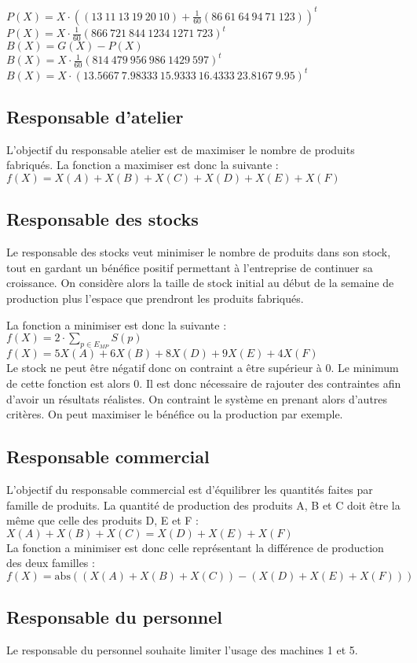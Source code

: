 \documentclass[a4paper, 11pt]{article}
\begin{document}
$P(X) = X\cdot\left((13~11~13~19~20~10) + \frac{1}{60}(86~61~64~94~71~123)\right)^t$ \\
$P(X) = X\cdot\frac{1}{60}(866~721~844~1234~1271~723)^t$ \\

$B(X) = G(X) - P(X)$ \\
$B(X) = X\cdot\frac{1}{60}(814~479~956~986~1429~597)^t$ \\
$B(X) = X\cdot(13.5667~7.98333~15.9333~16.4333~23.8167~9.95)^t$ \\

\subsection{Responsable d'atelier}
L'objectif du responsable atelier est de maximiser le nombre de produits fabriqués.
La fonction a maximiser est donc la suivante : \\
$ f(X) = X(A) + X(B) + X(C) + X(D) + X(E) + X(F) $

\subsection{Responsable des stocks}
Le responsable des stocks veut minimiser le nombre de produits dans son stock,
tout en gardant un bénéfice positif permettant à l'entreprise de continuer sa croissance.
On considère alors la taille de stock initial au début de la semaine de production
plus l'espace que prendront les produits fabriqués.

La fonction a minimiser est donc la suivante : \\
$f(X) = 2\cdot \sum_{p\in E_{MP}} S(p)$ \\
$f(X) = 5 X(A) + 6 X(B) + 8 X(D) + 9 X(E) + 4 X(F)$ \\

Le stock ne peut être négatif donc on contraint a être supérieur à 0.
Le minimum de cette fonction est alors 0. Il est donc nécessaire de rajouter
des contraintes afin d'avoir un résultats réalistes.
On contraint le système en prenant alors d'autres critères.
On peut maximiser le bénéfice ou la production par exemple.

\subsection{Responsable commercial}
L'objectif du responsable commercial est d'équilibrer les quantités faites par famille de produits.
La quantité de production des produits A, B et C doit être la même que celle des produits D, E et F : \\
$X(A) + X(B) + X(C) = X(D) + X(E) + X(F)$ \\

La fonction a minimiser est donc celle représentant la différence de production des deux familles : \\
$f(X) = \mbox{abs}((X(A) + X(B) + X(C)) - (X(D) + X(E) + X(F))) $

\subsection{Responsable du personnel}
Le responsable du personnel souhaite limiter l'usage des machines 1 et 5.
\end{document}
